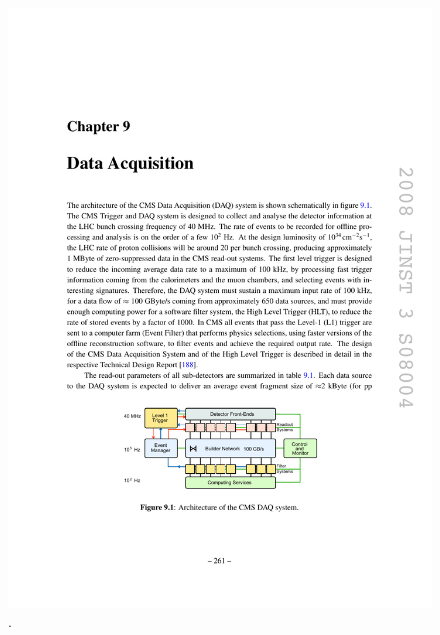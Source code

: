 \begin{figure}[tbh]
\centering
\includegraphics[width=5in]{figures/daq.pdf}
\caption{.}
\label{fig:daq}
\end{figure}

